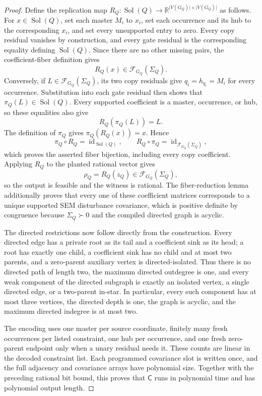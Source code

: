 \documentclass{article}
\begin{document}
\begin{proof}
Define the replication map \(R_Q:\operatorname{Sol}(Q)\to\mathbb R^{\lvert V(G_Q)\rvert\times\lvert V(G_Q)\rvert}\) as follows.  For \(x\in\operatorname{Sol}(Q)\), set each master \(M_i\) to \(x_i\), set each occurrence and its hub to the corresponding \(x_i\), and set every unsupported entry to zero.  Every copy residual vanishes by construction, and every gate residual is the corresponding equality defining \(\operatorname{Sol}(Q)\).  Since there are no other missing pairs, the coefficient-fiber definition gives
\[
R_Q(x)\in\mathcal F_{G_Q}(\Sigma_Q).
\]
Conversely, if \(L\in\mathcal F_{G_Q}(\Sigma_Q)\), its two copy residuals give \(q_i=h_{q_i}=M_i\) for every occurrence.  Substitution into each gate residual then shows that \(\pi_Q(L)\in\operatorname{Sol}(Q)\).  Every supported coefficient is a master, occurrence, or hub, so these equalities also give
\[
R_Q(\pi_Q(L))=L.
\]
The definition of \(\pi_Q\) gives \(\pi_Q(R_Q(x))=x\).  Hence
\[
\pi_Q\circ R_Q=\operatorname{id}_{\operatorname{Sol}(Q)},
\qquad
R_Q\circ\pi_Q=\operatorname{id}_{\mathcal F_{G_Q}(\Sigma_Q)},
\]
which proves the asserted fiber bijection, including every copy coefficient.  Applying \(R_Q\) to the planted rational vector gives
\[
\rho_Q=R_Q(z_Q)\in\mathcal F_{G_Q}(\Sigma_Q),
\]
so the output is feasible and the witness is rational.  The fiber-reduction lemma additionally proves that every one of these coefficient matrices corresponds to a unique supported SEM disturbance covariance, which is positive definite by congruence because \(\Sigma_Q\succ0\) and the compiled directed graph is acyclic.

The directed restrictions now follow directly from the construction.  Every directed edge has a private root as its tail and a coefficient sink as its head; a root has exactly one child, a coefficient sink has no child and at most two parents, and a zero-parent auxiliary vertex is directed-isolated.  Thus there is no directed path of length two, the maximum directed outdegree is one, and every weak component of the directed subgraph is exactly an isolated vertex, a single directed edge, or a two-parent in-star.  In particular, every such component has at most three vertices, the directed depth is one, the graph is acyclic, and the maximum directed indegree is at most two.

The encoding uses one master per source coordinate, finitely many fresh occurrences per listed constraint, one hub per occurrence, and one fresh zero-parent endpoint only when a unary residual needs it.  These counts are linear in the decoded constraint list.  Each programmed covariance slot is written once, and the full adjacency and covariance arrays have polynomial size.  Together with the preceding rational bit bound, this proves that \(\mathsf C\) runs in polynomial time and has polynomial output length.


\end{proof}
\end{document}
